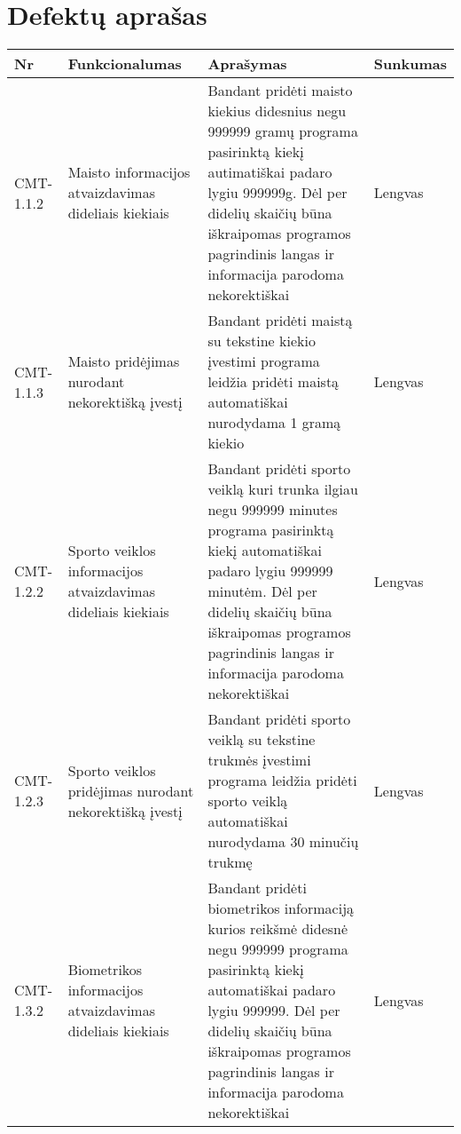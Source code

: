 \documentclass[oneside]{VUMIFPSkursinis}
\begin{document}
\section{Defektų aprašas}
\begin{center}
    \begin{tabular}{ |p{1cm}| p{7cm} | p{7cm} | p{2cm} |}
    \hline
    Nr &  Funkcionalumas & Aprašymas & Sunkumas \\ \hline
    CMT-1.1.2 & Maisto informacijos atvaizdavimas dideliais kiekiais & Bandant pridėti maisto kiekius didesnius negu 999999 gramų programa pasirinktą kiekį autimatiškai padaro lygiu 999999g. Dėl per didelių skaičių būna iškraipomas programos pagrindinis langas ir informacija parodoma nekorektiškai & Lengvas \\ \hline
    CMT-1.1.3 & Maisto pridėjimas nurodant nekorektišką įvestį & Bandant pridėti maistą su tekstine kiekio įvestimi programa leidžia pridėti maistą automatiškai nurodydama 1 gramą kiekio & Lengvas \\ \hline
    CMT-1.2.2 & Sporto veiklos informacijos atvaizdavimas dideliais kiekiais & Bandant pridėti sporto veiklą kuri trunka ilgiau negu 999999 minutes programa pasirinktą kiekį automatiškai padaro lygiu 999999 minutėm. Dėl per didelių skaičių būna iškraipomas programos pagrindinis langas ir informacija parodoma nekorektiškai & Lengvas \\ \hline
    CMT-1.2.3 & Sporto veiklos pridėjimas nurodant nekorektišką įvestį & Bandant pridėti sporto veiklą su tekstine trukmės įvestimi programa leidžia pridėti sporto veiklą automatiškai nurodydama 30 minučių trukmę & Lengvas \\ \hline
    CMT-1.3.2 & Biometrikos informacijos atvaizdavimas dideliais kiekiais & Bandant pridėti biometrikos informaciją kurios reikšmė didesnė negu 999999 programa pasirinktą kiekį automatiškai padaro lygiu 999999. Dėl per didelių skaičių būna iškraipomas programos pagrindinis langas ir informacija parodoma nekorektiškai & Lengvas \\ \hline
   \hline
    \end{tabular}
\end{center}
\end{document}
